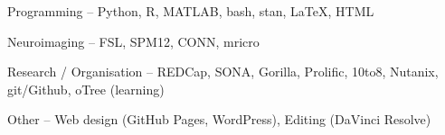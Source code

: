 \datedsubsectionnarrow{}{}
{Programming -- \footnotesize Python, R, MATLAB, bash, stan, \LaTeX, HTML}
{}

\datedsubsectionnarrow{}{}
{Neuroimaging -- \footnotesize FSL, SPM12, CONN, mricro}
{}

\datedsubsectionnarrow{}{}
{Research / Organisation -- \footnotesize REDCap, SONA, Gorilla, Prolific, 10to8, Nutanix, git/Github, oTree (learning)}
{}

\datedsubsectionnarrow{}{}
{Other -- \footnotesize Web design (GitHub Pages, WordPress), Editing (DaVinci Resolve)}
{}